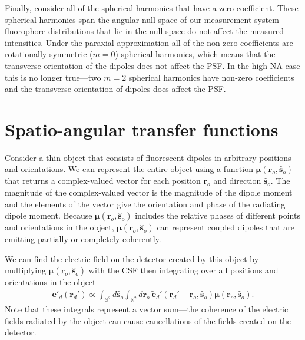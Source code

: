 \documentclass[11pt]{article}
\providecommand{\mb}[1]{\mathbf{#1}}
\providecommand{\ro}[1]{\mathbf{\mathbf{r}}_o}
\providecommand{\so}[1]{\mathbf{\hat{s}}_o}
\providecommand{\rd}[1]{\mathbf{r}_d}
\providecommand{\bs}[1]{\boldsymbol{#1}}
\begin{document}
Finally, consider all of the spherical harmonics that have a zero
coefficient. These spherical harmonics span the angular null space of our
measurement system---fluorophore distributions that lie in the null space do not
affect the measured intensities. Under the paraxial approximation all of the
non-zero coefficients are rotationally symmetric ($m=0$) spherical harmonics,
which means that the transverse orientation of the dipoles does not affect the
PSF. In the high NA case this is no longer true---two $m=2$ spherical harmonics
have non-zero coefficients and the transverse orientation of dipoles does affect
the PSF.

\section{Spatio-angular transfer functions}
Consider a thin object that consists of fluorescent dipoles in arbitrary
positions and orientations. We can represent the entire object using a function
$\bs{\mu}(\ro{}, \so{})$ that returns a complex-valued vector for each position
$\ro{}$ and direction $\so{}$. The magnitude of the complex-valued vector is the
magnitude of the dipole moment and the elements of the vector give the orientation
and phase of the radiating dipole moment. Because $\bs{\mu}(\ro{}, \so{})$
includes the relative phases of different points and orientations in the object,
$\bs{\mu}(\ro{}, \so{})$ can represent coupled dipoles that are emitting
partially or completely coherently.

We can find the electric field on the detector created by this object by
multiplying $\bs{\mu}(\ro{}, \so{})$ with the CSF then integrating over all
positions and orientations in the object
\begin{align}
  \mb{e}'_d(\rd{}')  \propto \int_{\mathbb{S}^2}d\so{}\int_{\mathbb{R}^2}d\ro{} \ \tilde{\mb{e}}_d'(\rd{}' - \mb{r}_o, \so{})\bs{\mu}(\ro{}, \so{}).\label{eq:eforward}
\end{align}
Note that these integrals represent a vector sum---the coherence of the electric
fields radiated by the object can cause cancellations of the fields created on
the detector.
\end{document}

